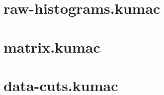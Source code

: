 \documentclass[11pt, english, fleqn, DIV=15, headinclude, BCOR=2cm]{scrreprt}
\begin{document}
\begin{appendix}
    

    \section{raw-histograms.kumac}
    \label{raw-histograms.kumac}

    

    \section{matrix.kumac}
    \label{matrix.kumac}

    

    \section{data-cuts.kumac}
    \label{data-cuts.kumac}

    

\end{appendix}
\end{document}
